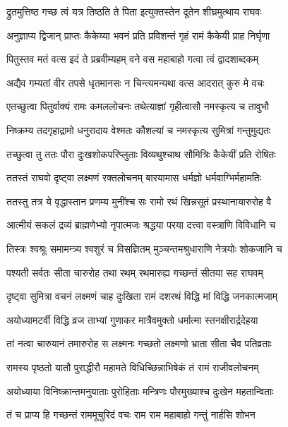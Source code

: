 \twolineshloka
{द्रुतमुत्तिष्ठ गच्छ त्वं यत्र तिष्ठति ते पिता}
{इत्युक्तस्तेन दूतेन शीघ्रमुत्थाय राघवः} %

\twolineshloka
{अनुज्ञाप्य द्विजान् प्राप्तः कैकेय्या भवनं प्रति}
{प्रविशन्तं गृहं रामं कैकेयी प्राह निर्घृणा} %

\twolineshloka
{पितुस्तव मतं वत्स इदं ते प्रब्रवीम्यहम्}
{वने वस महाबाहो गत्वा त्वं द्वादशाब्दकम्} %

\twolineshloka
{अद्यैव गम्यतां वीर तपसे धृतमानसः}
{न चिन्त्यमन्यथा वत्स आदरात् कुरु मे वचः} %

\twolineshloka
{एतच्छुत्वा पितुर्वाक्यं रामः कमललोचनः}
{तथेत्याज्ञां गृहीत्वासौ नमस्कृत्य च तावुभौ} %

\twolineshloka
{निष्क्रम्य तदगृहाद्रामो धनुरादाय वेश्मतः}
{कौशल्यां च नमस्कृत्य सुमित्रां गन्तुमुद्यतः} %

\twolineshloka
{तच्छुत्वा तु ततः पौरा दुःखशोकपरिप्लुताः}
{विव्यथुश्चाथ सौमित्रिः कैकेयीं प्रति रोषितः} %

\twolineshloka
{ततस्तं राघवो दृष्ट्वा लक्ष्मणं रक्तलोचनम्}
{बारयामास धर्मज्ञो धर्मवाग्भिर्महामतिः} %

\twolineshloka
{ततस्तु तत्र ये वृद्धास्तान प्रणम्य मुनींश्च सः}
{रामो रथं खिन्नसूतं प्रस्थानायारुरोह वै} %

\twolineshloka
{आत्मीयं सकलं द्रव्यं ब्राह्मणेभ्यो नृपात्मजः}
{श्रद्धया परया दत्त्वा वस्त्राणि विविधानि च} %

\twolineshloka
{तिस्त्रः श्वश्रूः समामन्त्र्य श्वशुरं च विसज्ञितम्}
{मुञ्चन्तमश्रुधाराणि नेत्रयोः शोकजानि च} %

\twolineshloka
{पश्यती सर्वतः सीता चारुरोह तथा रथम्}
{रथमारुह्य गच्छन्तं सीतया सह राघवम्} %

\twolineshloka
{दृष्ट्वा सुमित्रा वचनं लक्ष्मणं चाह दुःखिता}
{रामं दशरथं विद्धि मां विद्धि जनकात्मजाम्} %

\twolineshloka
{अयोध्यामटर्वी विद्धि व्रज ताभ्यां गुणाकर}
{मात्रैवमुक्तो धर्मात्मा स्तनक्षीरार्द्रदेहया} %

\twolineshloka
{तां नत्वा चारुयानं तमारुरोह स लक्ष्मनः}
{गच्छतो लक्ष्मणो भ्राता सीता चैव पतिव्रताः} %

\twolineshloka
{रामस्य पृष्ठतो यातौ पुराद्धीरौ महामते}
{विधिच्छिन्नाभिषेकं तं रामं राजीवलोचनम्} %

\twolineshloka
{अयोध्याया विनिष्क्रान्तमनुयाताः पुरोहिताः}
{मन्त्रिणः पौरमुख्याश्च दुःखेन महतान्विताः} %

\twolineshloka
{तं च प्राप्य हि गच्छन्तं राममूचुरिदं वचः}
{राम राम महाबाहो गन्तुं नार्हसि शोभन} %

